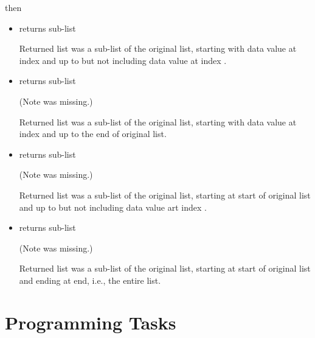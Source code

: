 \documentclass{coderdojo}
\begin{document}
then 
\begin{itemize}
\item {} returns sub-list 

Returned list was a sub-list of the original list, starting with data value at index  and up to but not including data value at index .

\item {} returns sub-list 

(Note  was missing.)

Returned list was a sub-list of the original list, starting with data value at index  and up to the end of original list.

\item {} returns sub-list 

(Note  was missing.)

Returned list was a sub-list of the original list, starting at start of original list and up to but not including data value art index .

\item {} returns sub-list 

(Note  was missing.)

Returned list was a sub-list of the original list,  starting at start of original list and ending at end, i.e., the entire list.
\end{itemize}
%
%
%
%


\newpage
\section*{Programming Tasks} 
\end{document}
